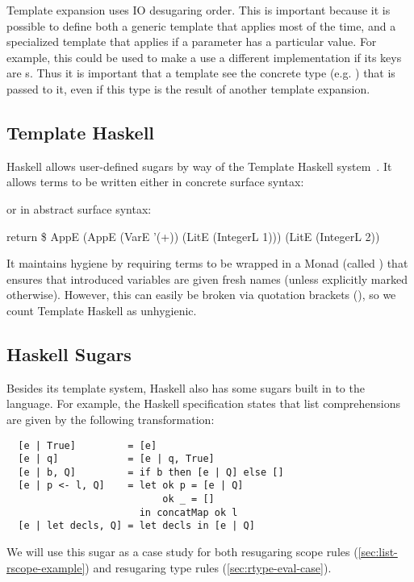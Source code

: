 Template expansion uses IO desugaring order. This is important because
it is possible
to define both a generic template that applies most of the time, and
a specialized template that applies if a parameter has a particular
value. For example, this could be used to make a  use a different
implementation if its keys are s. Thus it is important that
a template see the concrete type (e.g. ) that is passed to
it, even if this type is the result of another template expansion.

\subsection{Template Haskell} \label{sec:taxonomy-haskell}

Haskell allows user-defined sugars by way of the Template Haskell
system~\cite{haskell-templates}. It allows terms to be written either in concrete surface
syntax:
\begin{Codes}
  [| 1 + 2 |]
\end{Codes}
or in abstract surface syntax:
\begin{Codes}
  return \$ AppE (AppE (VarE '(+))
                      (LitE (IntegerL 1)))
                (LitE (IntegerL 2))
\end{Codes}

It maintains hygiene by requiring terms to be wrapped in a Monad
(called ) that ensures that introduced variables are given
fresh names (unless explicitly marked otherwise). However, this can
easily be broken via quotation brackets (\Code{[| ... |]}), so we
count Template Haskell as unhygienic.


\subsection{Haskell Sugars}

Besides its template system, Haskell also has some sugars built in to
the language. For example, the Haskell specification states that list
comprehensions~\cite[section 3.11]{haskell-language} are
given by the following transformation:
\begin{verbatim}
  [e | True]         = [e]
  [e | q]            = [e | q, True]
  [e | b, Q]         = if b then [e | Q] else []
  [e | p <- l, Q]    = let ok p = [e | Q]
                           ok _ = []
                       in concatMap ok l
  [e | let decls, Q] = let decls in [e | Q]
\end{verbatim}
We will use this sugar as a case study for both resugaring scope rules
(\cref{sec:list-rscope-example}) and resugaring type rules
(\cref{sec:rtype-eval-case}).

